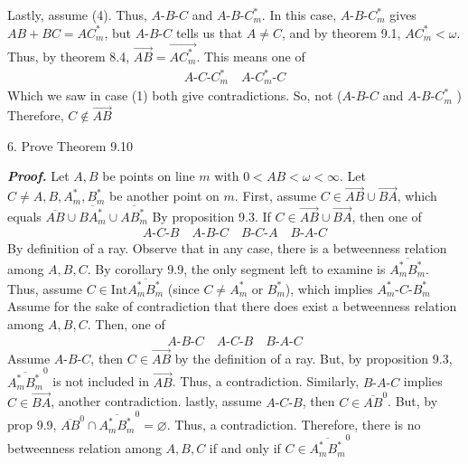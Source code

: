 \documentclass{report}
\begin{document}
    \bigbreak \noindent 
    Lastly, assume (4). Thus, $ A\text{-}B\text{-}C$ and $ A\text{-}B\text{-}C_{m}^{*}$. In this case, $ A\text{-}B\text{-}C_{m}^{*} $ gives $ AB + BC = AC_{m}^{*} $, but $ A\text{-}B\text{-}C$ tells us that $A \ne C$, and by theorem 9.1, $AC_{m}^{*} < \omega$. Thus, by theorem 8.4, $\overrightarrow{AB} = \overrightarrow{AC_{m}^{*}}$. This means one of 
    \begin{align*}
        A\text{-}C\text{-}C_{m}^{*} \quad A\text{-}C_{m}^{*}\text{-}C
    \end{align*}
    Which we saw in case (1) both give contradictions. So, not ($ A\text{-}B\text{-}C$ and $ A\text{-}B\text{-}C_{m}^{*}$ )
    \bigbreak \noindent 
    Therefore, $C \not\in \overrightarrow{AB} $ \endpf

    \pagebreak \bigbreak \noindent 
    \begin{mdframed}
        6. Prove Theorem 9.10
    \end{mdframed}
    \bigbreak \noindent 
    \textbf{\textit{Proof.}} Let $A,B$ be points on line $m$ with $0 < AB < \omega < \infty$. Let $C \ne A,B,A^{*}_{m},B^{*}_{m} $ be another point on $m$.
    \bigbreak \noindent 
    First, assume $C \in \overrightarrow{AB} \cup \overrightarrow{BA}$, which equals $\overline{AB} \cup \overline{BA^{*}_{m}}  \cup \overline{AB_{m}^{*}}$ By proposition 9.3. If $C \in \overrightarrow{AB} \cup \overrightarrow{BA}$, then one of 
    \begin{align*}
        A\text{-}C\text{-}B \quad A\text{-}B\text{-}C \quad B\text{-}C\text{-}A \quad B\text{-}A\text{-}C
    \end{align*}
    By definition of a ray. Observe that in any case, there is a betweenness relation among $A,B,C$. 
    \bigbreak \noindent 
    By corollary 9.9, the only segment left to examine is $ \overline{A_{m}^{*}B_{m}^{*}}$. Thus, assume $C \in \text{Int}\overline{A_{m}^{*}B_{m}^{*}} $ (since $C \ne A^{*}_{m}$ or $B_{m}^{*}$), which implies $ A^{*}_{m}\text{-}C\text{-} B_{m}^{*}$
    \bigbreak \noindent 
    Assume for the sake of contradiction that there does exist a betweenness relation among $A,B,C$. Then, one of 
    \begin{align*}
        A\text{-}B\text{-}C \quad A\text{-}C\text{-}B \quad B\text{-}A\text{-}C
    \end{align*}
    \bigbreak \noindent 
    Assume $ A\text{-}B\text{-}C $, then $C \in \overrightarrow{AB}$ by the definition of a ray. But, by proposition 9.3, $\overline{A_{m}^{*}B^{*}_{m}}^{0} $ is not included in $\overrightarrow{AB}$. Thus, a contradiction. Similarly, $ B\text{-}A\text{-}C $ implies $ C \in \overrightarrow{BA}$, another contradiction.
    \bigbreak \noindent 
    lastly, assume $ A\text{-}C\text{-}B $, then $C \in \overline{AB}^{0}$. But, by prop 9.9, $ \overline{AB}^{0}\cap \overline{A^{*}_{m}B^{*}_{m}}^{0} = \varnothing$. Thus, a contradiction.
    \bigbreak \noindent 
    Therefore, there is no betweenness relation among $A,B,C$ if and only if $C \in \overline{A^{*}_{m}B^{*}_{m}}^{0}$ \endpf

    
    
\end{document}
